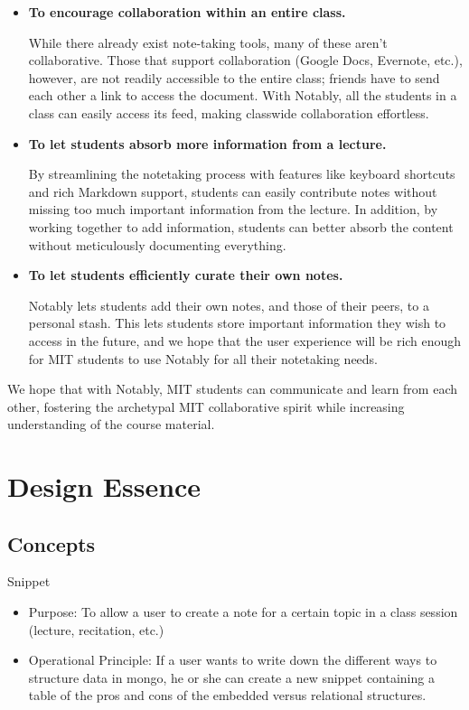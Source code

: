 \documentclass{article}
\begin{document}
\begin{itemize}
\item  \textbf{To encourage collaboration within an entire class.}

While there already exist note-taking tools, many of these aren't collaborative. Those that support collaboration (Google Docs, Evernote, etc.), however, are not readily accessible to the entire class; friends have to send each other a link to access the document. With Notably, all the students in a class can easily access its feed, making classwide collaboration effortless.

\item \textbf{To let students absorb more information from a lecture.}

By streamlining the notetaking process with features like keyboard shortcuts and rich Markdown support, students can easily contribute notes without missing too much important information from the lecture. In addition, by working together to add information, students can better absorb the content without meticulously documenting everything.

\item \textbf{To let students efficiently curate their own notes.}

Notably lets students add their own notes, and those of their peers, to a personal stash. This lets students store important information they wish to access in the future, and we hope that the user experience will be rich enough for MIT students to use Notably for all their notetaking needs.

\end{itemize}

We hope that with Notably, MIT students can communicate and learn from each other, fostering the archetypal MIT collaborative spirit while increasing understanding of the course material.

\newpage

\section*{Design Essence}
\subsection*{Concepts}
Snippet
\begin{itemize}
\item Purpose: To allow a user to create a note for a certain topic in a class session (lecture, recitation, etc.)
\item Operational Principle: If a user wants to write down the different ways to structure data in mongo, he or she can create a new snippet containing a table of the pros and cons of the embedded versus relational structures.
\end{itemize}
\end{document}
